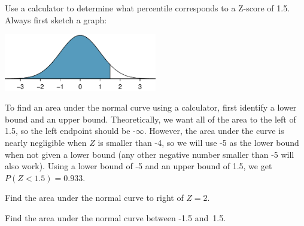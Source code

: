 \begin{examplewrap}
\begin{nexample}{Use a calculator to determine what percentile corresponds to a Z-score of 1.5.}
Always first sketch a graph:\footnotemark
\begin{center}
\includegraphics[width=0.5\textwidth]{ch_distributions/figures/zscoreleftof1point5/zscoreleftof1point5}\vspace{-2mm}
\end{center}
To find an area under the normal curve using a calculator, first identify a lower bound and an upper bound. Theoretically, we want all of the area to the left of 1.5, so the left endpoint should be -$\infty$. However, the area under the curve is nearly negligible when $Z$ is smaller than -4, so we will use -5 as the lower bound when not given a lower bound (any other negative number smaller than -5 will also work). Using a lower bound of -5 and an upper bound of 1.5, we get $P(Z < 1.5) = 0.933$.
\end{nexample}
\end{examplewrap}

\begin{exercisewrap}
\begin{nexercise}
Find the area under the normal curve to right of $Z=2$.~\footnotemark
\end{nexercise}
\end{exercisewrap}

\begin{exercisewrap}
\begin{nexercise}Find the area under the normal curve between -1.5 and~1.5.~\footnotemark\end{nexercise}
\end{exercisewrap}



